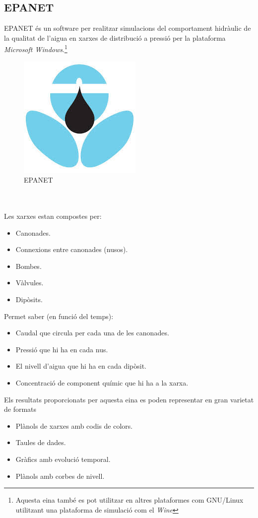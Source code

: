 \documentclass[12pt]{article}
\begin{document}
\subsection{EPANET}
EPANET és un software per realitzar simulacions del comportament hidràulic de la qualitat de l'aigua en xarxes de distribució a pressió per la plataforma \textit{Microsoft Windows}.\footnote{Aquesta eina també es pot utilitzar en altres plataformes com GNU/Linux utilitzant una plataforma de simulació com el \textit{Wine}}
\begin{figure}[h!]
	\centering
	\includegraphics[scale=0.5]{imatges/epanet.jpeg}
	\caption{EPANET}
\end{figure}
\\\\Les xarxes estan compostes per:
\begin{itemize}
	\item Canonades.
	\item Connexions entre canonades (nusos).
	\item Bombes.
	\item Vàlvules.
	\item Dipòsits.
\end{itemize}
\vspace{0.5cm}Permet saber (en funció del temps):
\begin{itemize}
	\item Caudal que circula per cada una de les canonades.
	\item Pressió que hi ha en cada nus.
	\item El nivell d'aigua que hi ha en cada dipòsit.
	\item Concentració de component químic que hi ha a la xarxa.
\end{itemize}
\vspace{0.5cm}Els resultats proporcionats per aquesta eina es poden representar en gran varietat de formats
\begin{itemize}
	\item Plànols de xarxes amb codis de colors.
	\item Taules de dades.
	\item Gràfics amb evolució temporal.
	\item Plànols amb corbes de nivell.
\end{itemize}
\end{document}
